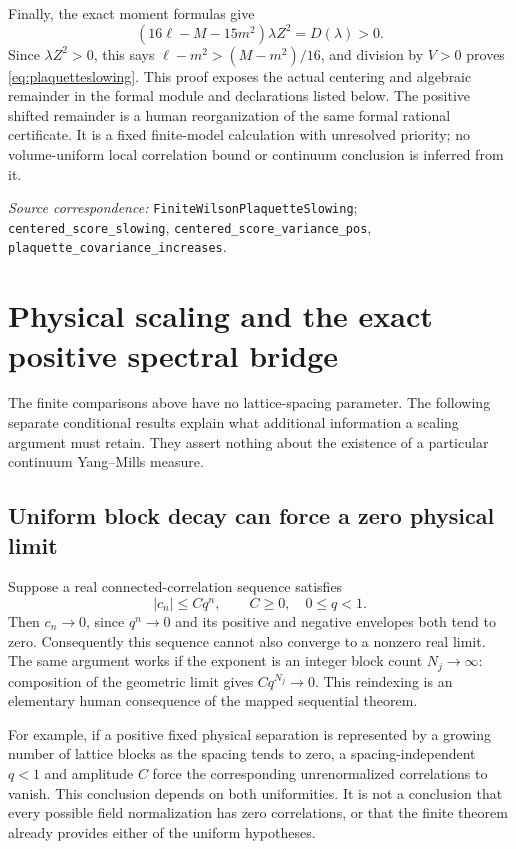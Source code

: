 \documentclass[11pt]{article}
\newcommand{\code}[1]{{\small\nolinkurl{#1}}}
\begin{document}
Finally, the exact moment formulas give
\[
 (16\ell-M-15m^2)\lambda Z^2=D(\lambda)>0.
\]
Since $\lambda Z^2>0$, this says
$\ell-m^2>(M-m^2)/16$, and division by $V>0$ proves
\eqref{eq:plaquetteslowing}. This proof exposes the actual centering
and algebraic remainder in the formal module and declarations
listed below. The positive shifted remainder
is a human reorganization of the same formal rational certificate.
It is a fixed finite-model calculation with unresolved priority;
no volume-uniform local correlation bound or continuum conclusion is
inferred from it.
\par\smallskip\begingroup\small\raggedright
\textit{Source correspondence:} \code{FiniteWilsonPlaquetteSlowing};
\code{centered_score_slowing},
\code{centered_score_variance_pos},
\code{plaquette_covariance_increases}.
\par\endgroup



\section{Physical scaling and the exact positive spectral bridge}
\label{sec:scalingspectral}
The finite comparisons above have no lattice-spacing parameter.
The following separate conditional results explain what additional
information a scaling argument must retain. They assert nothing about
the existence of a particular continuum Yang--Mills measure.

\subsection*{Uniform block decay can force a zero physical limit}
Suppose a real connected-correlation sequence satisfies
\begin{equation}\label{eq:blockdecayscaling}
 |c_n|\leq Cq^n,\qquad C\geq0,\quad0\leq q<1.
\end{equation}
Then $c_n\to0$, since $q^n\to0$ and its positive and negative
envelopes both tend to zero. Consequently this sequence cannot also
converge to a nonzero real limit. The same argument works if the
exponent is an integer block count $N_j\to\infty$: composition of
the geometric limit gives $Cq^{N_j}\to0$. This reindexing is an
elementary human consequence of the mapped sequential theorem.

For example, if a positive fixed physical separation is represented
by a growing number of lattice blocks as the spacing tends to zero,
a spacing-independent $q<1$ and amplitude $C$ force the corresponding
unrenormalized correlations to vanish. This conclusion depends on
both uniformities. It is not a conclusion that every possible field
normalization has zero correlations, or that the finite theorem
already provides either of the uniform hypotheses.
\end{document}
